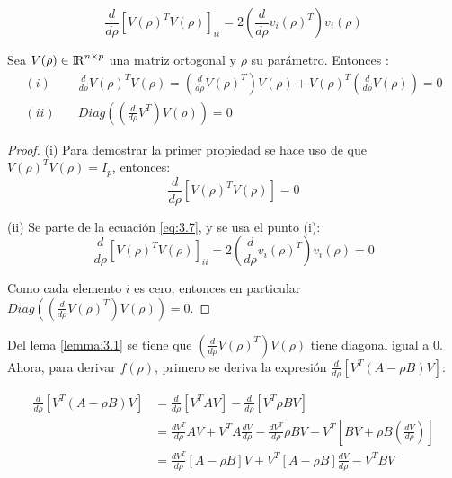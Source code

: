 \begin{equation}\label{eq:3.7}
\frac{d}{d\rho}[V(\rho)^T V(\rho)]_{ii} =  2 \left( \frac{d}{d\rho}v_i(\rho)^T \right)  v_i(\rho)
\end{equation}

\bigskip

\begin{lemma}\label{lemma:3.1}
Sea $V(\rho) \in {\rm I\!R}^{n \times p}$ una matriz ortogonal y $\rho$ su parámetro. Entonces \cite{ngo2012trace}:
\begin{equation*}
\begin{aligned}
(i)&  \quad \frac{d}{d\rho} V(\rho)^TV(\rho) = \left(\frac{d}{d\rho}V(\rho)^T\right) V(\rho)  + V(\rho)^T  \left( \frac{d}{d\rho} V(\rho) \right) = 0 \\
(ii)& \quad Diag \left(\left(\frac{d}{d\rho}V^T \right)V(\rho) \right) = 0 
\end{aligned}
\end{equation*}
\end{lemma}

\begin{proof}
\bigskip
(i) Para demostrar la primer propiedad se hace uso de que $V(\rho)^T V(\rho) = I_p$, entonces:
\begin{equation*}
\frac{d}{d\rho} [V(\rho)^T V(\rho)] = 0  
\end{equation*}

(ii) Se parte de la ecuación \ref{eq:3.7}, y se usa el punto (i):
\begin{equation*}
  \frac{d}{d\rho} [V(\rho)^T V(\rho)]_{ii} =    2 \left( \frac{d}{d\rho}v_i(\rho)^T \right)  v_i(\rho) = 0
\end{equation*}

Como cada elemento $i$ es cero, entonces en particular $Diag\left( \left(\frac{d}{d\rho}V(\rho)^T \right) V(\rho) \right)=0 $.
\end{proof}

Del lema \ref{lemma:3.1} se tiene que $\left(\frac{d}{d\rho}V(\rho)^T \right) V(\rho)$ tiene diagonal igual a 0. Ahora, para derivar $f(\rho)$, primero se deriva la expresión $\frac{d}{d\rho}\left[V^T (A-\rho B)V \right]$:

\begin{equation}\label{eq:3.8}
\begin{aligned}
	\frac{d}{d\rho}\left[V^T (A-\rho B)V \right] & = \frac{d}{d\rho} \left[V^T A V \right]- \frac{d}{d\rho}\left[V^T \rho B V\right] \\
	& = \frac{dV^T}{d\rho}  AV +  V^T A \frac{dV}{d\rho} - \frac{dV^T}{d\rho} \rho BV - V^T \left[BV + \rho B \left(\frac{dV}{d\rho} \right) \right] \\
	& = \frac{dV^T}{d\rho} \left[A -\rho B \right] V + V^T \left[A- \rho B \right]\frac{dV}{d\rho} - V^TBV \\
\end{aligned} 
\end{equation}


